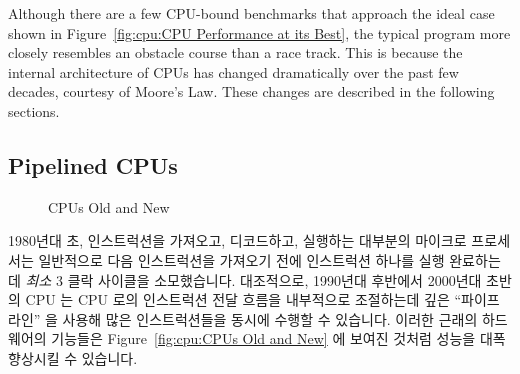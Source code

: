 Although there are a few CPU-bound benchmarks that approach the ideal case
shown in Figure~\ref{fig:cpu:CPU Performance at its Best},
the typical program more closely resembles an obstacle course than
a race track.
This is because the internal architecture of CPUs has changed dramatically
over the past few decades, courtesy of Moore's Law.
These changes are described in the following sections.
\fi

\subsection{Pipelined CPUs}
\label{sec:cpu:Pipelined CPUs}

\begin{figure}[tb]
\centering
{}
\caption{CPUs Old and New}
\end{figure}

1980년대 초, 인스트럭션을 가져오고, 디코드하고, 실행하는 대부분의 마이크로
프로세서는 일반적으로 다음 인스트럭션을 가져오기 전에 인스트럭션 하나를 실행
완료하는데 \emph{최소} 3 클락 사이클을 소모했습니다.
대조적으로, 1990년대 후반에서 2000년대 초반의 CPU 는 CPU 로의 인스트럭션 전달
흐름을 내부적으로 조절하는데 깊은 ``파이프라인'' 을 사용해 많은 인스트럭션들을
동시에 수행할 수 있습니다.
이러한 근래의 하드웨어의 기능들은 Figure~\ref{fig:cpu:CPUs Old and New} 에
보여진 것처럼 성능을 대폭 향상시킬 수 있습니다.

